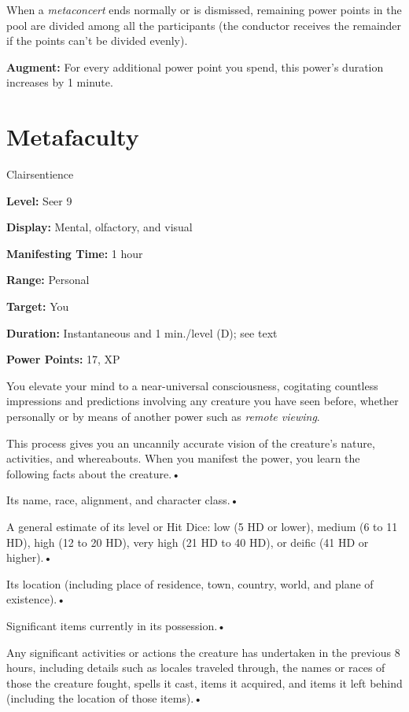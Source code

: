 \documentclass{article}
\begin{document}
When a \textit{metaconcert }ends normally or is dismissed, remaining power points 
in the pool are divided among all the participants (the conductor receives the 
remainder if the points can't be divided evenly).

\textbf{Augment:} For every additional power point you spend, this power's duration 
increases by 1 minute.

\vspace{12pt}
\section*{Metafaculty}

Clairsentience

\textbf{Level:} Seer 9

\textbf{Display:} Mental, olfactory, and visual

\textbf{Manifesting Time:} 1 hour

\textbf{Range:} Personal

\textbf{Target:} You

\textbf{Duration:} Instantaneous and 1 min./level (D); see text

\textbf{Power Points:} 17, XP

You elevate your mind to a near-universal consciousness, cogitating countless impressions 
and predictions involving any creature you have seen before, whether personally 
or by means of another power such as \textit{remote viewing}.

This process gives you an uncannily accurate vision of the creature's nature, activities, 
and whereabouts. When you manifest the power, you learn the following facts about 
the creature.• 

\parindent=3pt
Its name, race, alignment, and character class.• 

A general estimate of its level or Hit Dice: low (5 HD or lower), medium (6 to 
11 HD), high (12 to 20 HD), very high (21 HD to 40 HD), or deific (41 HD or higher).• 

\parindent=7pt
Its location (including place of residence, town, country, world, and plane of 
existence).• 

\parindent=3pt
Significant items currently in its possession.• 

Any significant activities or actions the creature has undertaken in the previous 
8 hours, including details such as locales traveled through, the names or races 
of those the creature fought, spells it cast, items it acquired, and items it left 
behind (including the location of those items).• 
\end{document}
